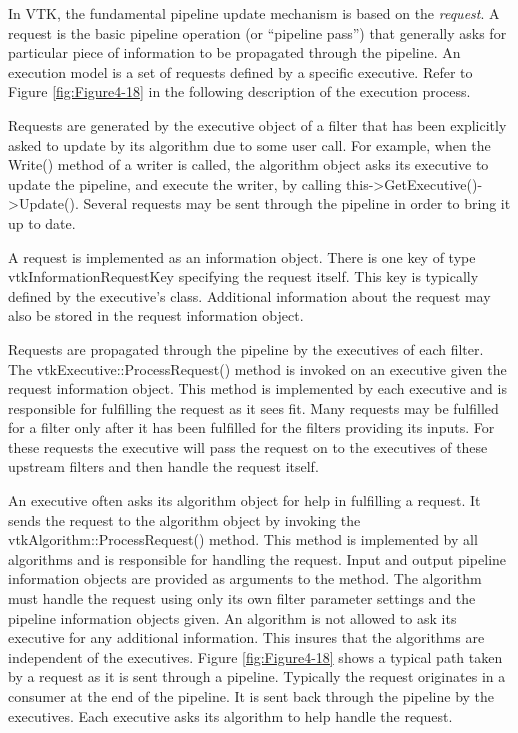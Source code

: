 \begin{description}[leftmargin=0cm,labelindent=0cm]
\item[Pipeline Execution Models]
\label{subsubsec:pipeline_execution_models}

In VTK, the fundamental pipeline update mechanism is based on the \emph{request}. A request is the basic pipeline operation (or ``pipeline pass'') that generally asks for particular piece of information to be propagated through the pipeline. An execution model is a set of requests defined by a specific executive. Refer to Figure \ref{fig:Figure4-18} in the following description of the execution process.

Requests are generated by the executive object of a filter that has been explicitly asked to update by its algorithm due to some user call. For example, when the Write() method of a writer is called, the algorithm object asks its executive to update the pipeline, and execute the writer, by calling this->GetExecutive()->Update(). Several requests may be sent through the pipeline in order to bring it up to date.

A request is implemented as an information object. There is one key of type vtkInformationRequestKey specifying the request itself. This key is typically defined by the executive's class. Additional information about the request may also be stored in the request information object.
       
Requests are propagated through the pipeline by the executives of each filter. The vtkExecutive::ProcessRequest() method is invoked on an executive given the request information object. This method is implemented by each executive and is responsible for fulfilling the request as it sees fit. Many requests may be fulfilled for a filter only after it has been fulfilled for the filters providing its inputs. For these requests the executive will pass the request on to the executives of these upstream filters and then handle the request itself.

An executive often asks its algorithm object for help in fulfilling a request. It sends the request to the algorithm object by invoking the vtkAlgorithm::ProcessRequest() method. This method is implemented by all algorithms and is responsible for handling the request. Input and output pipeline information objects are provided as arguments to the method. The algorithm must handle the request using only its own filter parameter settings and the pipeline information objects given. An algorithm is not allowed to ask its executive for any additional information. This insures that the algorithms are independent of the executives. Figure \ref{fig:Figure4-18} shows a typical path taken by a request as it is sent through a pipeline. Typically the request originates in a consumer at the end of the pipeline. It is sent back through the pipeline by the executives. Each executive asks its algorithm to help handle the request.
\end{description}


